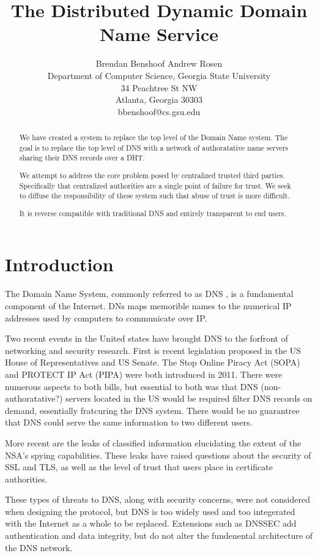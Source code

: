\documentclass[11pt]{IEEEtran} %
\title{The Distributed Dynamic Domain Name Service}
\author{
Brendan Benshoof \qquad Andrew Rosen  \\Department of Computer Science, Georgia State University\\ 34 Peachtree St NW \\ Atlanta, Georgia 30303\\  bbenshoof@cs.gsu.edu }
\begin{document}
\maketitle

\begin{abstract}
We have created a system to replace the top level of the Domain Name system. The goal is to replace the top level of DNS with a network of authoratative name servers sharing their DNS records over a DHT.

We attempt to address the core problem posed by centralized trusted third parties. Specifically that centralized authorities are a single point of failure for trust. We seek to diffuse the responsibility of these system such that abuse of trust is more difficult.

It is reverse compatible with traditional DNS and entirely transparent to end users.


\end{abstract}


\section{Introduction}
The Domain Name System, commonly referred to as DNS \cite{mockapetris2003rfc} \cite{mockapetris2004rfc}, is a fundamental component of the Internet.  DNs maps memorible names to the numerical IP addresses used by computers to communicate over IP. 

Two recent events in the United states have brought DNS to the forfront of networking and security research.  First is recent legislation proposed in the US House of Representatives and US Senate. The Stop Online Piracy Act (SOPA) \cite{sopa} and PROTECT IP Act (PIPA) \cite{pipa} were both introduced in 2011.  There were numerous aspects to both bills, but essential to both was that DNS (non-authoratative?) servers located in the US would be required filter DNS records on demand, essentially fratcuring the DNS system.  There would be no guarantree that DNS could serve the same information to two different users.

More recent are the leaks of classified information elucidating the extent of the NSA's spying capabilities. These leaks have raised questions about the security of SSL and TLS, as well as the level of trust that users place in certificate authorities.

These types of threats to DNS, along with security concerns, were not considered when designing the protocol, but DNS is too widely used and too integerated with the Internet as a whole to be replaced.    Extensions such as DNSSEC \cite{blacka2013clarifications} add authentication and data integrity, but do not alter the fundenental architecture of the DNS network.
\end{document}
